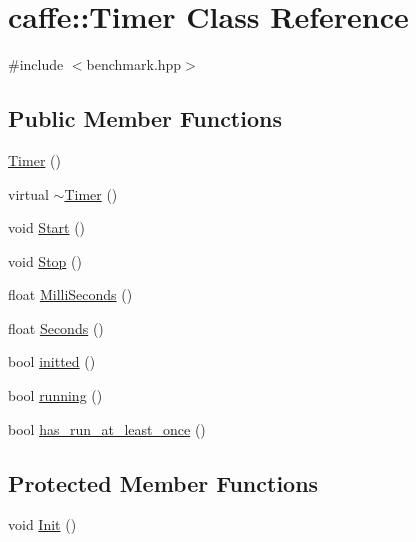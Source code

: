 \hypertarget{classcaffe_1_1_timer}{\section{caffe\+:\+:Timer Class Reference}
\label{classcaffe_1_1_timer}
}


{\ttfamily \#include $<$benchmark.\+hpp$>$}

\subsection*{Public Member Functions}
\begin{DoxyCompactItemize}
\item 
\hyperlink{classcaffe_1_1_timer_a986a71e971114c61d2e73eea02968fcf}{Timer} ()
\item 
virtual \hyperlink{classcaffe_1_1_timer_a683ffcb27a78eae1a3dbae88f0cd1cc9}{$\sim$\+Timer} ()
\item 
void \hyperlink{classcaffe_1_1_timer_ae387bcee3008150e8d9a8b95a5ca279c}{Start} ()
\item 
void \hyperlink{classcaffe_1_1_timer_ae99595b83e6ef8f1cfa4a933c359011b}{Stop} ()
\item 
float \hyperlink{classcaffe_1_1_timer_a236a04bd3da087fbd0d028977cce7a15}{Milli\+Seconds} ()
\item 
float \hyperlink{classcaffe_1_1_timer_a5a5c499062bb98600cc061575c58510a}{Seconds} ()
\item 
bool \hyperlink{classcaffe_1_1_timer_a8f44fdd43378c9ef58471c6aae17c814}{initted} ()
\item 
bool \hyperlink{classcaffe_1_1_timer_ae1a416ef3dfd11aefc73da5760bc98d7}{running} ()
\item 
bool \hyperlink{classcaffe_1_1_timer_ae06252439c4e1731a4c36b5a9810787c}{has\+\_\+run\+\_\+at\+\_\+least\+\_\+once} ()
\end{DoxyCompactItemize}
\subsection*{Protected Member Functions}
\begin{DoxyCompactItemize}
\item 
void \hyperlink{classcaffe_1_1_timer_a9e5e1052cb6ea672940a300dc630c6c9}{Init} ()
\end{DoxyCompactItemize}
